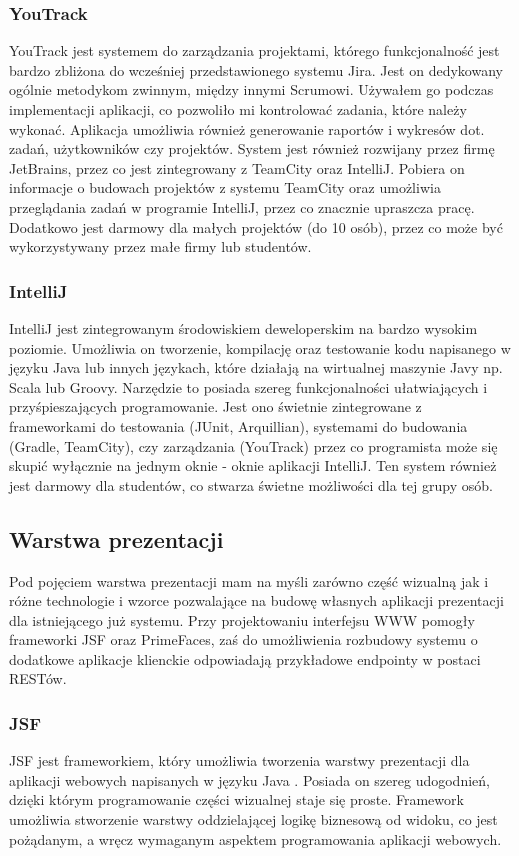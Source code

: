 \subsubsection{YouTrack}
YouTrack jest systemem do zarządzania projektami, którego funkcjonalność jest bardzo zbliżona do wcześniej przedstawionego systemu Jira. Jest on dedykowany ogólnie metodykom zwinnym, między innymi Scrumowi. Używałem go podczas implementacji aplikacji, co pozwoliło mi kontrolować zadania, które należy wykonać. Aplikacja umożliwia również generowanie raportów i wykresów dot. zadań, użytkowników czy projektów. System jest również rozwijany przez firmę JetBrains, przez co jest zintegrowany z TeamCity oraz IntelliJ. Pobiera on informacje o budowach projektów z systemu TeamCity oraz umożliwia przeglądania zadań w programie IntelliJ, przez co znacznie upraszcza pracę. Dodatkowo jest darmowy dla małych projektów (do 10 osób), przez co może być wykorzystywany przez małe firmy lub studentów.

\subsubsection{IntelliJ}
IntelliJ jest zintegrowanym środowiskiem deweloperskim na bardzo wysokim poziomie. Umożliwia on tworzenie, kompilację oraz testowanie kodu napisanego w języku Java lub innych językach, które działają na wirtualnej maszynie Javy np. Scala lub Groovy. Narzędzie to posiada szereg funkcjonalności ułatwiających i przyśpieszających programowanie. Jest ono świetnie zintegrowane z frameworkami do testowania (JUnit, Arquillian), systemami do budowania (Gradle, TeamCity), czy zarządzania (YouTrack) przez co programista może się skupić wyłącznie na jednym oknie - oknie aplikacji IntelliJ. Ten system również jest darmowy dla studentów, co stwarza świetne możliwości dla tej grupy osób.


\subsection{Warstwa prezentacji}
Pod pojęciem warstwa prezentacji mam na myśli zarówno część wizualną jak i różne technologie i wzorce pozwalające na budowę własnych aplikacji prezentacji dla istniejącego już systemu. Przy projektowaniu interfejsu WWW pomogły frameworki JSF oraz PrimeFaces, zaś do umożliwienia rozbudowy systemu o dodatkowe aplikacje klienckie odpowiadają przykładowe endpointy w postaci RESTów.

\subsubsection{JSF}
JSF jest frameworkiem, który umożliwia tworzenia warstwy prezentacji dla aplikacji webowych napisanych w języku Java \cite{JSF}. Posiada on szereg udogodnień, dzięki którym programowanie części wizualnej staje się proste. Framework umożliwia stworzenie warstwy oddzielającej logikę biznesową od widoku, co jest pożądanym, a wręcz wymaganym aspektem programowania aplikacji webowych.


